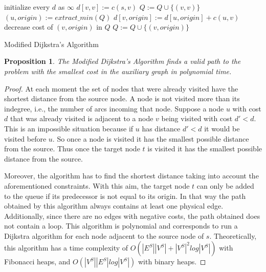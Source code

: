 \documentclass[conference]{IEEEtran}
\newtheorem{proposition}{Proposition}
\begin{document}
\begin{algorithm}
initialize every $d$ as $\infty$\;
{$d[v,v] := c(s,v)$\;
  $Q := Q \cup \{(v,v)\}$\;
}
  {$(u, origin) := extract\_min(Q)$\;
    {
      {$d[v, origin] := d[u, origin] + c(u,v)$\;
        {decrease cost of $(v,origin)$ in $Q$\;}
        {$Q := Q \cup \{(v,origin)\}$\;}
      }
    }
  }
\caption{Modified Dijkstra's Algorithm}
\label{alg:dij}
\end{algorithm}

\begin{proposition} The Modified Dijkstra's Algorithm finds a valid path to the problem with the smallest cost in the auxiliary graph in polynomial time.
\end{proposition}
\begin{proof}
  At each moment the set of nodes that were already visited have the shortest distance from the source node.
  A node is not visited more than its indegree, i.e., the number of arcs incoming that node.
  Suppose a node $u$ with cost $d$ that was already visited is adjacent to a node $v$ being visited with cost $d' < d$.
  This is an impossible situation because if $u$ has distance $d'<d$ it would be visited before $u$.
  So once a node is visited it has the smallest possible distance from the source.
  Thus once the target node $t$ is visited it has the smallest possible distance from the source.

  Moreover, the algorithm has to find the shortest distance taking into account the aforementioned constraints.
  With this aim, the target node $t$ can only be added to the queue if its predecessor is not equal to its origin.
  In that way the path obtained by this algorithm always contains at least one physical edge. Additionally, since there are no edges with negative costs, the path obtained does not contain a loop.
  This algorithm is polynomial and corresponds to run a Dijkstra algorithm for each node adjacent to the source node of $s$.
  Theoretically, this algorithm has a time complexity of $O(|E^S||V^S| + |V^S|^2log|V^S|)$ with Fibonacci heaps, and $O(|V^S||E^S|log|V^S|)$ with binary heaps.
\end{proof}
\end{document}
